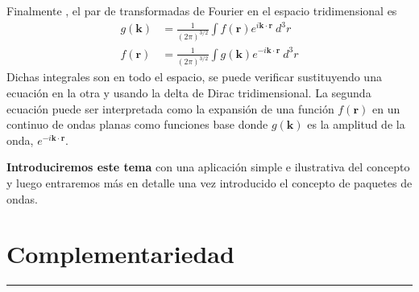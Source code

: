 Finalmente , el par de transformadas de Fourier en el espacio tridimensional es 
\begin{equation}
\begin{split}
    g(\mathbf{k}) &= \frac{1}{(2\pi)^{3/2}} \int f(\mathbf{r}) e^{i\mathbf{k}\cdot\mathbf{r}}~d^3r \\
    f(\mathbf{r}) &= \frac{1}{(2\pi)^{3/2}} \int g(\mathbf{k}) e^{-i\mathbf{k}\cdot\mathbf{r}}~d^3r
    \label{trans3d}
\end{split}    
\end{equation}
Dichas integrales son en todo el espacio, se puede verificar sustituyendo una ecuación en la otra y usando la delta de Dirac tridimensional. La segunda ecuación puede ser interpretada como la expansión de una función $f(\mathbf{r})$ en un continuo de ondas planas como funciones base donde $g(\mathbf{k})$ es la amplitud de la onda, $e^{-i\mathbf{k}\cdot\mathbf{r}}$.



\newpage
\begin{intro}{}
\textbf{Introduciremos este tema} con una aplicación simple e ilustrativa del concepto y luego entraremos más en detalle una vez introducido el concepto de paquetes de ondas.
\end{intro}
 
\section{\huge{Complementariedad}}
\textcolor{myred}{\hrule}

